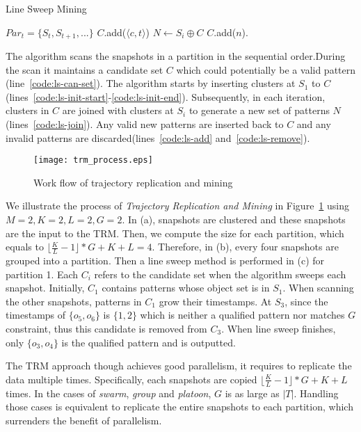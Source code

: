 \begin{algorithm}
\caption{Line Sweep Mining}
\label{algo:line-sweep}
\begin{algorithmic}[1]
\Require $Par_t = \{S_t, S_{t+1}, ...\}$
  \label{code:ls-can-set}
\label{code:ls-init-start}
\State $C$.add($\langle c, t \rangle $)
\EndFor
\label{code:ls-init-end}
\State $N \gets S_i \oplus C$ \label{code:ls-join}
			$C$.add($n$).
			\label{code:ls-add}
		\EndIf
	\EndFor
{}
	\label{code:ls-remove}
\EndFor
{}
\end{algorithmic}
\end{algorithm}

The algorithm scans the snapshots in a partition in the sequential order.During the scan it
maintains a candidate set $C$ which could potentially be a valid pattern (line~\ref{code:ls-can-set}).
The algorithm starts by inserting clusters at $S_1$ to $C$ (lines~\ref{code:ls-init-start}-\ref{code:ls-init-end}).
Subsequently, in each iteration, clusters in $C$ are joined with clusters at $S_i$ to generate
a new set of patterns $N$(lines~\ref{code:ls-join}). Any valid new patterns are inserted back to $C$
and any invalid patterns are discarded(lines~\ref{code:ls-add} and~\ref{code:ls-remove}).

\begin{figure}[h]
\centering
\texttt{[image: trm\_process.eps]}
\caption{Work flow of trajectory replication and mining}
\label{fig:trm_process}
\end{figure}

\begin{example}
We illustrate the process of \emph{Trajectory Replication and Mining} in Figure~\ref{fig:trm_process} using $M=2, K=2, L = 2, G=2$. In (a), snapshots are clustered and these snapshots are the input to the TRM. Then, we compute the size 
for each partition, which equals to $\lfloor \frac{K}{L}-1 \rfloor *G+K+L = 4$. Therefore, in (b), every four snapshots
are grouped into a partition. Then a line sweep method is performed in (c) for partition 1. Each
$C_i$ refers to the candidate set  when the algorithm sweeps each snapshot. Initially, $C_1$ contains
patterns whose object set is in $S_1$. When scanning the other snapshots, patterns in $C_1$ grow
their timestamps. At $S_3$, since the timestamps of $\{o_5,o_6\}$ is $\{1,2\}$ which is neither
a qualified pattern nor matches $G$ constraint, thus this candidate is removed from $C_3$. When line
sweep finishes, only $\{o_3,o_4\}$ is the qualified pattern and is outputted.
\end{example}


The TRM approach though achieves good parallelism, 
it requires to replicate the data multiple times. 
Specifically, each snapshots are copied $\lfloor \frac{K}{L}-1 \rfloor *G+K+L$ times. 
In the cases of \emph{swarm}, \emph{group} and \emph{platoon}, $G$ is as large as $|T|$. 
Handling those cases is equivalent to replicate the entire snapshots to each partition, 
which surrenders the benefit of parallelism.


